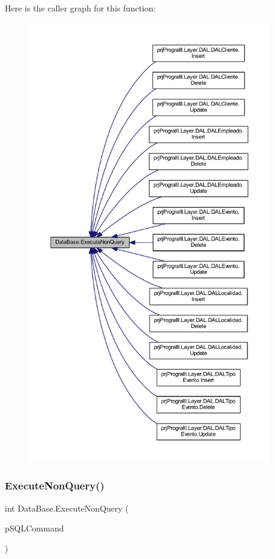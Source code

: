 Here is the caller graph for this function\+:
\nopagebreak
\begin{figure}[H]
\begin{center}
\leavevmode
\includegraphics[height=550pt]{class_data_base_a496a94816107552b090d59a31c9aba33_icgraph}
\end{center}
\end{figure}
\hypertarget{class_data_base_ab93baf9d76501c17ba8b31c647137fbf}{}\label{class_data_base_ab93baf9d76501c17ba8b31c647137fbf} 
\subsubsection{\texorpdfstring{Execute\+Non\+Query()}{ExecuteNonQuery()}\hspace{0.1cm}{\footnotesize\ttfamily [2/4]}}
{\footnotesize\ttfamily int Data\+Base.\+Execute\+Non\+Query (\begin{DoxyParamCaption}\item[{Sql\+Command}]{p\+S\+Q\+L\+Command }\end{DoxyParamCaption})}



